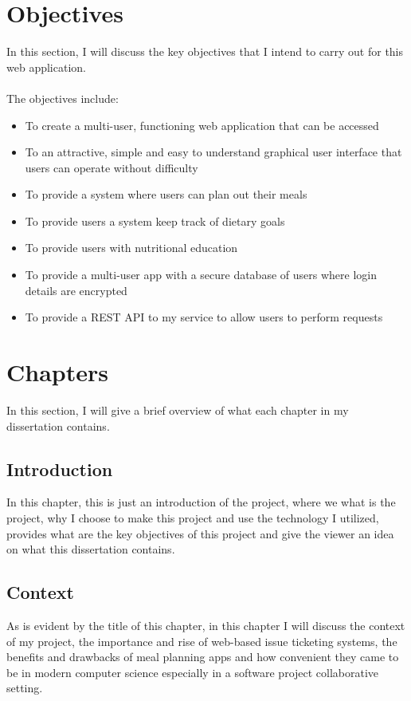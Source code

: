 \section {Objectives}

In this section, I will discuss the key objectives that I intend to carry out for this web application. \\ \\
The objectives include:

\begin{itemize}
\item To create a multi-user, functioning web application that can be accessed
\item To an attractive, simple and easy to understand graphical user interface that users can operate without difficulty
\item To provide a system where users can plan out their meals
\item To provide users a system keep track of dietary goals
\item To provide users with nutritional education
\item To provide a multi-user app with a secure database of users where login details are encrypted
\item To provide a REST API to my service to allow users to perform requests
\end{itemize}

\section {Chapters}

In this section, I will give a brief overview of what each chapter in my dissertation contains.

\subsection{Introduction}

In this chapter, this is just an introduction of the project, where we what is the project, why I choose to make this project and use the technology I utilized, provides what are the key objectives of this project and give the viewer an idea on what this dissertation contains.

\subsection{Context}

As is evident by the title of this chapter, in this chapter I will discuss the context of my project, the importance and rise of web-based issue ticketing systems, the benefits and drawbacks of meal planning apps and how convenient they came to be in modern computer science especially in a software project collaborative setting.

